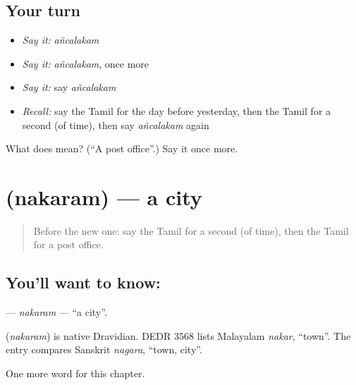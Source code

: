 \subsection*{Your turn}
\begin{itemize}
\raggedright
  \item \emph{Say it:} \emph{añcalakam}
  \item \emph{Say it:} \emph{añcalakam}, once more
  \item \emph{Say it:} say \emph{añcalakam}
  \item \emph{Recall:} say the Tamil for the day before yesterday, then the Tamil for a second (of time), then say \emph{añcalakam} again
\end{itemize}

\begin{tcolorbox}[breakable,colback=teal!4,colframe=teal!35!black,title={Before you move on}]
What does  mean? (\textquotedblleft{}A post office\textquotedblright{}.) Say it once more.
\end{tcolorbox}
\section[\texorpdfstring{\ta{நகரம்} (nakaram)}{நகரம் (nakaram)}]{ (nakaram) — a city}

\label{lesson:TA-C234-nakaram}



\begin{quote}
Before the new one: say the Tamil for a second (of time), then the Tamil for a post office.
\end{quote}

\subsection*{You'll want to know: }
\textbf{} — \emph{nakaram} — \textquotedblleft{}a city\textquotedblright{}.

\begin{cousinweb}
\textbf{} (\emph{nakaram}) is native Dravidian. DEDR 3568 lists Malayalam \emph{nakar}, \textquotedblleft{}town\textquotedblright{}. The entry compares Sanskrit \emph{nagara}, \textquotedblleft{}town, city\textquotedblright{}.
\end{cousinweb}

\begin{grammarlens}[title={What you've built}]
One more word for this chapter.
\end{grammarlens}

